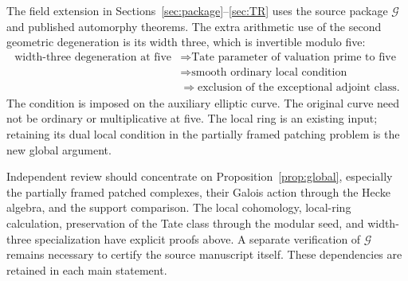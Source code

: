 \documentclass[11pt,a4paper]{article}
\theoremstyle{definition}\newtheorem{definition}[theorem]{Definition}
\theoremstyle{remark}\newtheorem*{remark}{Remark}
\newcommand{\Ginput}{\mathcal G}
\begin{document}
The field extension in Sections~\ref{sec:package}--\ref{sec:TR} uses the source package $\Ginput$ and
published automorphy theorems. The extra arithmetic use of the second
geometric degeneration is its width three, which is invertible modulo five:
\begin{align*}
\text{width-three degeneration at five}
&\Longrightarrow \text{Tate parameter of valuation prime to five}\\
&\Longrightarrow \text{smooth ordinary local condition}\\
&\Longrightarrow \text{exclusion of the exceptional adjoint class}.
\end{align*}
The condition is imposed on the auxiliary elliptic curve. The original curve
need not be ordinary or multiplicative at five. The local ring is an existing
input; retaining its dual local condition in the partially framed patching
problem is the new global argument.

Independent review should concentrate on Proposition~\ref{prop:global},
especially the partially framed patched complexes, their Galois action through
the Hecke algebra, and the support comparison. The local cohomology, local-ring
calculation, preservation of the Tate class through the modular seed, and
width-three specialization have explicit proofs above. A separate verification
of $\Ginput$ remains necessary to certify the source manuscript itself.
These dependencies are retained in each main statement.
\end{document}
